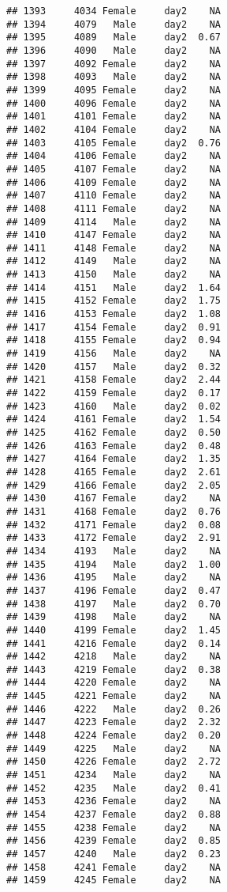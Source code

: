 \documentclass[
]{article}
\begin{document}
\begin{verbatim}
## 1393     4034 Female     day2    NA
## 1394     4079   Male     day2    NA
## 1395     4089   Male     day2  0.67
## 1396     4090   Male     day2    NA
## 1397     4092 Female     day2    NA
## 1398     4093   Male     day2    NA
## 1399     4095 Female     day2    NA
## 1400     4096 Female     day2    NA
## 1401     4101 Female     day2    NA
## 1402     4104 Female     day2    NA
## 1403     4105 Female     day2  0.76
## 1404     4106 Female     day2    NA
## 1405     4107 Female     day2    NA
## 1406     4109 Female     day2    NA
## 1407     4110 Female     day2    NA
## 1408     4111 Female     day2    NA
## 1409     4114   Male     day2    NA
## 1410     4147 Female     day2    NA
## 1411     4148 Female     day2    NA
## 1412     4149   Male     day2    NA
## 1413     4150   Male     day2    NA
## 1414     4151   Male     day2  1.64
## 1415     4152 Female     day2  1.75
## 1416     4153 Female     day2  1.08
## 1417     4154 Female     day2  0.91
## 1418     4155 Female     day2  0.94
## 1419     4156   Male     day2    NA
## 1420     4157   Male     day2  0.32
## 1421     4158 Female     day2  2.44
## 1422     4159 Female     day2  0.17
## 1423     4160   Male     day2  0.02
## 1424     4161 Female     day2  1.54
## 1425     4162 Female     day2  0.50
## 1426     4163 Female     day2  0.48
## 1427     4164 Female     day2  1.35
## 1428     4165 Female     day2  2.61
## 1429     4166 Female     day2  2.05
## 1430     4167 Female     day2    NA
## 1431     4168 Female     day2  0.76
## 1432     4171 Female     day2  0.08
## 1433     4172 Female     day2  2.91
## 1434     4193   Male     day2    NA
## 1435     4194   Male     day2  1.00
## 1436     4195   Male     day2    NA
## 1437     4196 Female     day2  0.47
## 1438     4197   Male     day2  0.70
## 1439     4198   Male     day2    NA
## 1440     4199 Female     day2  1.45
## 1441     4216 Female     day2  0.14
## 1442     4218   Male     day2    NA
## 1443     4219 Female     day2  0.38
## 1444     4220 Female     day2    NA
## 1445     4221 Female     day2    NA
## 1446     4222   Male     day2  0.26
## 1447     4223 Female     day2  2.32
## 1448     4224 Female     day2  0.20
## 1449     4225   Male     day2    NA
## 1450     4226 Female     day2  2.72
## 1451     4234   Male     day2    NA
## 1452     4235   Male     day2  0.41
## 1453     4236 Female     day2    NA
## 1454     4237 Female     day2  0.88
## 1455     4238 Female     day2    NA
## 1456     4239 Female     day2  0.85
## 1457     4240   Male     day2  0.23
## 1458     4241 Female     day2    NA
## 1459     4245 Female     day2    NA

\end{verbatim}
\end{document}
